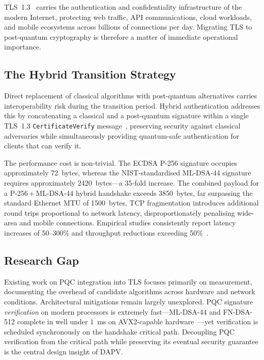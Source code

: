 \documentclass[preprint,10pt,3p]{elsarticle}
\begin{document}
TLS~1.3~\cite{Cremers2016,Cheval2022} carries the authentication and
confidentiality infrastructure of the modern Internet, protecting web traffic,
API communications, cloud workloads, and mobile ecosystems across billions of
connections per day.  Migrating TLS to post-quantum cryptography is therefore
a matter of immediate operational importance.

\subsection{The Hybrid Transition Strategy}

Direct replacement of classical algorithms with post-quantum alternatives
carries interoperability risk during the transition period.  Hybrid
authentication addresses this by concatenating a classical and a post-quantum
signature within a single TLS~1.3 \texttt{CertificateVerify}
message~\cite{Bindel2017,WiggersIETF2024}, preserving security against
classical adversaries while simultaneously providing quantum-safe authentication
for clients that can verify it.

The performance cost is non-trivial.  The ECDSA P-256 signature occupies
approximately 72~bytes, whereas the NIST-standardised ML-DSA-44
signature~\cite{FIPS204} requires approximately 2420~bytes---a 35-fold
increase.  The combined payload for a P-256\,+\,ML-DSA-44 hybrid handshake
exceeds 3850~bytes, far surpassing the standard Ethernet MTU of 1500~bytes.
TCP fragmentation introduces additional round trips proportional to network
latency, disproportionately penalising wide-area and mobile connections.
Empirical studies consistently report latency increases of 50--300\% and
throughput reductions exceeding 50\%~\cite{Paquin2020,Sikeridis2020a,
Sikeridis2020b,Montenegro2026}.

\subsection{Research Gap}

Existing work on PQC integration into TLS focuses primarily on measurement,
documenting the overhead of candidate algorithms across hardware and network
conditions.  Architectural mitigations remain largely unexplored.  PQC
signature \emph{verification} on modern processors is extremely fast---ML-DSA-44
and FN-DSA-512 complete in well under 1~ms on AVX2-capable
hardware~\cite{OQS2017}---yet verification is scheduled synchronously on the
handshake critical path.  Decoupling PQC verification from the critical path
while preserving its eventual security guarantee is the central design insight
of DAPV.
\end{document}
